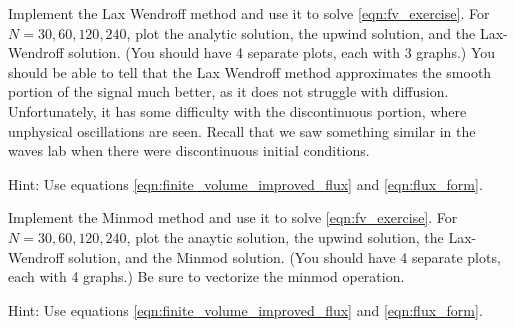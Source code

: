 
% 
Implement the Lax Wendroff method and use it to solve \eqref{eqn:fv_exercise}.
For $N=30,60,120,240$, plot the analytic solution, the upwind solution, and the Lax-Wendroff solution.
(You should have 4 separate plots, each with 3 graphs.)
You should be able to tell that the Lax Wendroff method approximates the smooth portion of the signal much better, as it does not struggle with diffusion.
Unfortunately, it has some difficulty with the discontinuous portion, where unphysical oscillations are seen.
Recall that we saw something similar in the waves lab when there were discontinuous initial conditions.

Hint: Use equations \ref{eqn:finite_volume_improved_flux} and \ref{eqn:flux_form}.

Implement the Minmod method and use it to solve \eqref{eqn:fv_exercise}.
For $N=30,60,120,240$, plot the anaytic solution, the upwind solution, the Lax-Wendroff solution, and the Minmod solution.
(You should have 4 separate plots, each with 4 graphs.)
Be sure to vectorize the minmod operation.

Hint: Use equations \ref{eqn:finite_volume_improved_flux} and \ref{eqn:flux_form}.
